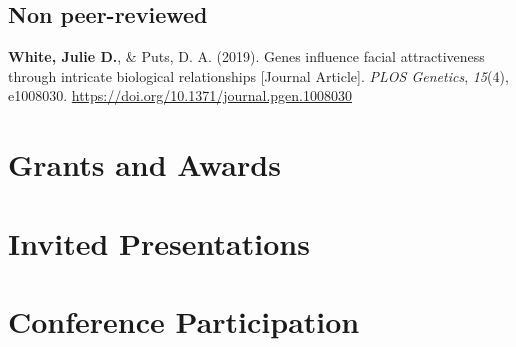 \documentclass[11pt, a4paper]{awesome-cv}
\begin{document}
\hypertarget{non-peer-reviewed}{%
\subsection{Non peer-reviewed}\label{non-peer-reviewed}}

\begingroup
\setlength{\parindent}{-0.5in}
\setlength{\leftskip}{0.5in}

\hypertarget{refs_nonreviewed}{}
\leavevmode\hypertarget{ref-White__2019_Attractiveness}{}%
\textbf{White, Julie D.}, \& Puts, D. A. (2019). Genes influence facial
attractiveness through intricate biological relationships {[}Journal
Article{]}. \emph{PLOS Genetics}, \emph{15}(4), e1008030.
\url{https://doi.org/10.1371/journal.pgen.1008030}

\endgroup

\hypertarget{grants-and-awards}{%
\section{Grants and Awards}\label{grants-and-awards}}

\begin{cventries}
    \vspace{-4.0mm}
    \vspace{-4.0mm}
    \vspace{-4.0mm}
    \vspace{-4.0mm}
    \vspace{-4.0mm}
\end{cventries}

\hypertarget{invited-presentations}{%
\section{Invited Presentations}\label{invited-presentations}}

\begingroup
\setlength{\parindent}{-0.5in}
\setlength{\leftskip}{0.5in}

\endgroup

\hypertarget{conference-participation}{%
\section{Conference Participation}\label{conference-participation}}
\end{document}
